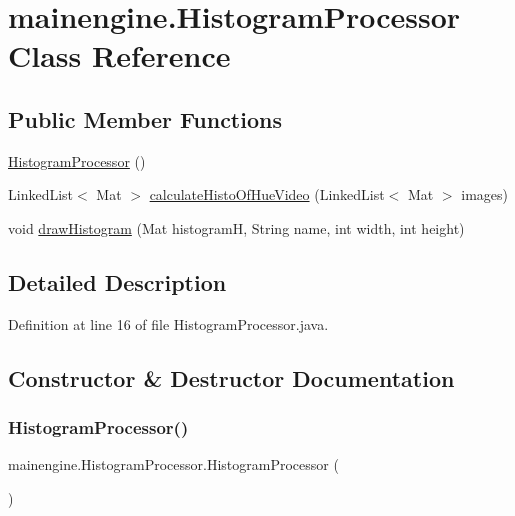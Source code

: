 \hypertarget{classmainengine_1_1_histogram_processor}{}\section{mainengine.\+Histogram\+Processor Class Reference}
\label{classmainengine_1_1_histogram_processor}
\subsection*{Public Member Functions}
\begin{DoxyCompactItemize}
\item 
\hyperlink{classmainengine_1_1_histogram_processor_a357b5277d361f75b17473832ef789c3d}{Histogram\+Processor} ()
\item 
Linked\+List$<$ Mat $>$ \hyperlink{classmainengine_1_1_histogram_processor_a5bd85446efa3f4d33a6dd02e34bafce6}{calculate\+Histo\+Of\+Hue\+Video} (Linked\+List$<$ Mat $>$ images)
\item 
void \hyperlink{classmainengine_1_1_histogram_processor_adff19084e721e59757acca5b259f8161}{draw\+Histogram} (Mat histogramH, String name, int width, int height)
\end{DoxyCompactItemize}


\subsection{Detailed Description}


Definition at line 16 of file Histogram\+Processor.\+java.



\subsection{Constructor \& Destructor Documentation}
\hypertarget{classmainengine_1_1_histogram_processor_a357b5277d361f75b17473832ef789c3d}{}\label{classmainengine_1_1_histogram_processor_a357b5277d361f75b17473832ef789c3d} 
\subsubsection{\texorpdfstring{Histogram\+Processor()}{HistogramProcessor()}}
{\footnotesize\ttfamily mainengine.\+Histogram\+Processor.\+Histogram\+Processor (\begin{DoxyParamCaption}{ }\end{DoxyParamCaption})}



